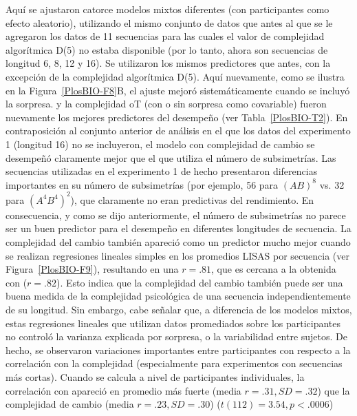 Aquí se ajustaron catorce modelos mixtos diferentes (con participantes como efecto aleatorio), utilizando el mismo conjunto de datos que antes al que se le agregaron los datos de 11 secuencias para las cuales el valor de complejidad algorítmica D(5) no estaba disponible (por lo tanto, ahora son secuencias de longitud 6, 8, 12 y 16). Se utilizaron los mismos predictores que antes, con la excepción de la complejidad algorítmica D(5). Aquí nuevamente, como se ilustra en la Figura~\ref{PlosBIO-F8}B, el ajuste mejoró sistemáticamente cuando se incluyó la sorpresa. \mdlbinfrag y la complejidad oT (con o sin sorpresa como covariable) fueron nuevamente los mejores predictores del desempeño (ver Tabla~\ref{PlosBIO-T2}). En contraposición al conjunto anterior de análisis en el que los datos del experimento 1 (longitud 16) no se incluyeron, el modelo con complejidad de cambio se desempeñó claramente mejor que el que utiliza el número de subsimetrías. Las secuencias utilizadas en el experimento 1 de hecho presentaron diferencias importantes en su número de subsimetrías (por ejemplo, 56 para $(AB)^8$ vs. 32 para $(A^4B^4)^2$), que claramente no eran predictivas del rendimiento. En consecuencia, y como se dijo anteriormente, el número de subsimetrías no parece ser un buen predictor para el desempeño en diferentes longitudes de secuencia. La complejidad del cambio también apareció como un predictor mucho mejor cuando se realizan regresiones lineales simples en los promedios LISAS por secuencia (ver Figura~\ref{PlosBIO-F9}), resultando en una $r = .81$, que es cercana a la obtenida con \mdlbin ($r = .82$). Esto indica que la complejidad del cambio también puede ser una buena medida de la complejidad psicológica de una secuencia independientemente de su longitud. Sin embargo, cabe señalar que, a diferencia de los modelos mixtos, estas regresiones lineales que utilizan datos promediados sobre los participantes no controló la varianza explicada por sorpresa, o la variabilidad entre sujetos. De hecho, se observaron variaciones importantes entre participantes con respecto a la correlación con la complejidad (especialmente para experimentos con secuencias más cortas). Cuando se calcula a nivel de participantes individuales, la correlación con \mdlbin apareció en promedio más fuerte (media $r = .31, SD = .32$) que la complejidad de cambio (media $r = .23, SD = .30$) ($t (112) = 3.54, p < .0006$)

